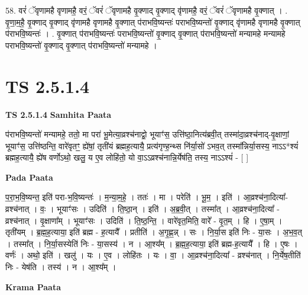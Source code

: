 \documentclass[17pt]{extarticle}
\begin{document}
58. वरं॑ ॅवृणामहै वृणामहै॒ वरं॒ ॅवरं॑ ॅवृणामहै वृ॒क्णाद् वृ॒क्णाद् वृ॑णामहै॒ वरं॒ ॅवरं॑ ॅवृणामहै वृ॒क्णात् । . वृ॒णा॒म॒है॒ वृ॒क्णाद् वृ॒क्णाद् वृ॑णामहै वृणामहै वृ॒क्णात् प॑राभवि॒ष्यन्तः॑ पराभवि॒ष्यन्तो॑ वृ॒क्णाद् वृ॑णामहै वृणामहै वृ॒क्णात् प॑राभवि॒ष्यन्तः॑ । . वृ॒क्णात् प॑राभवि॒ष्यन्तः॑ पराभवि॒ष्यन्तो॑ वृ॒क्णाद् वृ॒क्णात् प॑राभवि॒ष्यन्तो॑ मन्यामहे मन्यामहे पराभवि॒ष्यन्तो॑ वृ॒क्णाद् वृ॒क्णात् प॑राभवि॒ष्यन्तो॑ मन्यामहे । \newline
\pagebreak
{}

\section{ TS 2.5.1.4 }

\textbf{TS 2.5.1.4 } \newline
\textbf{Samhita Paata} \newline

प॑राभवि॒ष्यन्तो॑ मन्यामहे॒ ततो॒ मा परा॑ भू॒मेत्या॒व्रश्च॑नाद्वो॒ भूयाꣳ॑स॒ उत्ति॑ष्ठा॒नित्य॑ब्रवी॒त् तस्मा॑दा॒व्रश्च॑नाद्-वृ॒क्षाणां॒ भूयाꣳ॑स॒ उत्ति॑ष्ठन्ति॒ वारे॑वृतꣳ॒॒ ह्ये॑षां॒ तृती॑यं ब्रह्मह॒त्यायै॒ प्रत्य॑गृण्ह॒न्थ्स नि॑र्या॒सो॑ ऽभव॒त् तस्मा᳚न्निर्या॒सस्य॒ नाऽऽ*श्यं॑ ब्रह्मह॒त्यायै॒ ह्ये॑ष वर्णोऽथो॒ खलु॒ य ए॒व लोहि॑तो॒ यो वा॒ऽऽव्रश्च॑नान्नि॒र्येष॑ति॒ तस्य॒ नाऽऽश्यं॑ - [  ] \newline

\textbf{Pada Paata} \newline

प॒रा॒भ॒वि॒ष्यन्त॒ इति॑ परा-भ॒वि॒ष्यन्तः॑ । म॒न्या॒म॒हे॒ । ततः॑ । मा । परेति॑ । भू॒म॒ । इति॑ । आ॒व्रश्च॑ना॒दित्या᳚-व्रश्च॑नात् । वः॒ । भूयाꣳ॑सः । उदिति॑ । ति॒ष्ठा॒न् । इति॑ । अ॒ब्र॒वी॒त् । तस्मा᳚त् । आ॒व्रश्च॑ना॒दित्या᳚ - व्रश्च॑नात् । वृ॒क्षाणा᳚म् । भूयाꣳ॑सः । उदिति॑ । ति॒ष्ठ॒न्ति॒ । वारे॑वृत॒मिति॒ वारे᳚ - वृ॒त॒म् । हि । ए॒षा॒म् । तृती॑यम् । ब्र॒ह्म॒ह॒त्याया॒ इति॑ ब्रह्म - ह॒त्यायै᳚ । प्रतीति॑ । अ॒गृ॒ह्ण॒न्न् । सः । नि॒र्या॒स इति॑ निः - या॒सः । अ॒भ॒व॒त् । तस्मा᳚त् । नि॒र्या॒सस्येति॑ निः - या॒सस्य॑ । न । आ॒श्य᳚म् । ब्र॒ह्म॒ह॒त्याया॒ इति॑ ब्रह्म-ह॒त्यायै᳚ । हि । ए॒षः । वर्णः॑ । अथो॒ इति॑ । खलु॑ । यः । ए॒व । लोहि॑तः । यः । वा॒ । आ॒व्रश्च॑ना॒दित्या᳚ - व्रश्च॑नात् । नि॒र्येष॒तीति॑ निः - येष॑ति । तस्य॑ । न । आ॒श्य᳚म् ।  \newline


\textbf{Krama Paata} \newline
\end{document}
